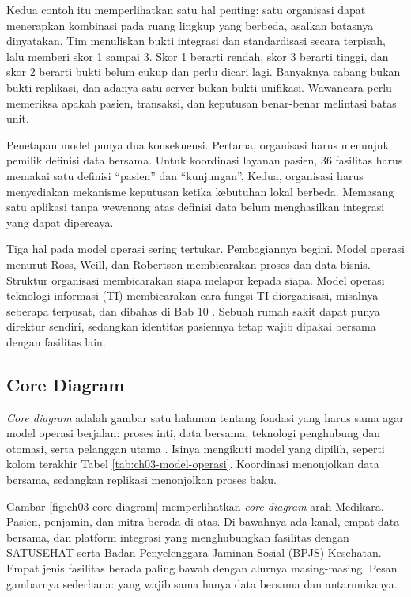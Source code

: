 Kedua contoh itu memperlihatkan satu hal penting: satu organisasi dapat
menerapkan kombinasi pada ruang lingkup yang berbeda, asalkan batasnya dinyatakan.
Tim menuliskan bukti integrasi dan standardisasi secara terpisah, lalu memberi
skor 1 sampai 3. Skor 1 berarti rendah, skor 3 berarti tinggi, dan skor 2 berarti
bukti belum cukup dan perlu dicari lagi. Banyaknya cabang bukan bukti replikasi,
dan adanya satu server bukan bukti unifikasi. Wawancara perlu memeriksa apakah
pasien, transaksi, dan keputusan benar-benar melintasi batas unit.

Penetapan model punya dua konsekuensi. Pertama, organisasi harus menunjuk pemilik
definisi data bersama. Untuk koordinasi layanan pasien, 36 fasilitas harus memakai
satu definisi ``pasien'' dan ``kunjungan''. Kedua, organisasi harus menyediakan
mekanisme keputusan ketika kebutuhan lokal berbeda. Memasang satu aplikasi tanpa
wewenang atas definisi data belum menghasilkan integrasi yang dapat dipercaya.

Tiga hal pada model operasi sering tertukar. Pembagiannya begini. Model operasi
menurut Ross, Weill, dan Robertson membicarakan proses dan data bisnis. Struktur
organisasi membicarakan siapa melapor kepada siapa. Model operasi teknologi
informasi (TI) membicarakan cara fungsi TI diorganisasi, misalnya seberapa
terpusat, dan dibahas di Bab 10 \cite{thorogood2025}. Sebuah rumah sakit dapat
punya direktur sendiri, sedangkan identitas pasiennya tetap wajib dipakai bersama
dengan fasilitas lain.

\subsection*{Core Diagram}

\textit{Core diagram} adalah gambar satu halaman tentang fondasi yang harus sama
agar model operasi berjalan: proses inti, data bersama, teknologi penghubung dan
otomasi, serta pelanggan utama \cite{ross2006}. Isinya mengikuti model yang
dipilih, seperti kolom terakhir Tabel \ref{tab:ch03-model-operasi}. Koordinasi
menonjolkan data bersama, sedangkan replikasi menonjolkan proses baku.

Gambar \ref{fig:ch03-core-diagram} memperlihatkan \textit{core diagram} arah
Medikara. Pasien, penjamin, dan mitra berada di atas. Di bawahnya ada kanal,
empat data bersama, dan platform integrasi yang menghubungkan fasilitas dengan
SATUSEHAT serta Badan Penyelenggara Jaminan Sosial (BPJS) Kesehatan. Empat jenis
fasilitas berada paling bawah dengan alurnya masing-masing. Pesan gambarnya
sederhana: yang wajib sama hanya data bersama dan antarmukanya.

